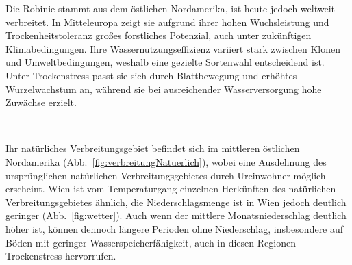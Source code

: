\documentclass[twocolumn]{scrartcl}
\makeatletter
\newcommand{\summary}[1]{%
  \par %
  {\small\sffamily
    \noindent #1\par}
  \vspace{-0.4em}
  \noindent\makebox[\linewidth]{\rule{0.33\linewidth}{0.4pt}}\\[-1.2em]
  \@afterindentfalse\@afterheading
}
\makeatother
\begin{document}
\summary{Die Robinie stammt aus dem östlichen Nordamerika, ist heute
  jedoch weltweit verbreitet. In Mitteleuropa zeigt sie aufgrund ihrer
  hohen Wuchsleistung und Trockenheitstoleranz großes forstliches
  Potenzial, auch unter zukünftigen Klimabedingungen. Ihre
  Wassernutzungseffizienz variiert stark zwischen Klonen und
  Umweltbedingungen, weshalb eine gezielte Sortenwahl entscheidend
  ist. Unter Trockenstress passt sie sich durch Blattbewegung und
  erhöhtes Wurzelwachstum an, während sie bei ausreichender
  Wasserversorgung hohe Zuwächse erzielt.}

Ihr natürliches Verbreitungsgebiet befindet sich im mittleren östlichen Nordamerika (Abb.~\ref{fig:verbreitungNatuerlich}), wobei eine Ausdehnung des ursprünglichen natürlichen Verbreitungsgebietes durch Ureinwohner möglich erscheint. Wien ist vom Temperaturgang einzelnen Herkünften des natürlichen Verbreitungsgebietes ähnlich, die Niederschlagsmenge ist in Wien jedoch deutlich geringer (Abb.~\ref{fig:wetter}). Auch wenn der mittlere Monatsniederschlag deutlich höher ist, können dennoch längere Perioden ohne Niederschlag, insbesondere auf Böden mit geringer Wasserspeicherfähigkeit, auch in diesen Regionen Trockenstress hervorrufen.
\end{document}
